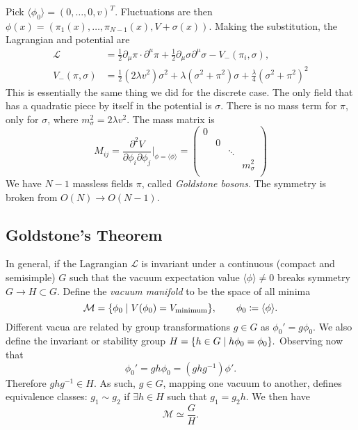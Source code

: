 Pick $\langle \phi_0 \rangle = (0, \dots, 0, v)^T$. Fluctuations are then $\phi(x) = (\pi_1(x), \dots, \pi_{N-1}(x), V + \sigma(x))$.
Making the substitution, the Lagrangian and potential are
\begin{align}
  \mathscr{L} &= \frac{1}{2} \partial_{\mu} \pi \cdot \partial^{\mu} \pi + \frac{1}{2} \partial_{\mu} \sigma \partial^{\mu} \sigma - V_-(\pi_i, \sigma), \\
  V_-(\pi, \sigma) &= \frac{1}{2} (2 \lambda v^2) \sigma^2 + \lambda (\sigma^2 + \pi^2) \sigma + \frac{\lambda}{4} (\sigma^2 + \pi^2)^2
\end{align}
This is essentially the same thing we did for the discrete case.
The only field that has a quadratic piece by itself in the potential is $\sigma$.
There is no mass term for $\pi$, only for $\sigma$, where $m_\sigma^2 = 2 \lambda v^2$.
The mass matrix is
\begin{equation}
  M_{ij} = \frac{\partial^2 V}{\partial \phi_i \partial \phi_j} \rvert_{\phi = \langle \phi \rangle} = 
  \begin{pmatrix}
   0 &  &  &  \\
    & 0 &  &  \\
    &  & \ddots &  \\
    &  &  & m_\sigma^2 \\
  \end{pmatrix}
\end{equation}
We have $N-1$ massless fields $\pi$, called \emph{Goldstone bosons}.
The symmetry is broken from $O(N) \to O(N-1)$.

\subsection{Goldstone's Theorem}%
\label{sub:goldstone_s_theorem}

In general, if the Lagrangian $\mathscr{L}$ is invariant under a continuous (compact and semisimple) $G$ such that the vacuum expectation value $\langle \phi \rangle \neq 0$ breaks symmetry $G \to H \subset G$.
Define the \emph{vacuum manifold} to be the space of all minima
\begin{equation}
  \mathcal{M} = \{\phi_0 \suchthat V(\phi_0) = V_{\text{minimum}}\}, \qquad \phi_0 \coloneqq \langle \phi \rangle.
\end{equation}
Different vacua are related by group transformations $g \in G$ as $\phi_0' = g \phi_0$.
We also define the invariant or stability group $H = \{h \in G \suchthat h \phi_0 = \phi_0\}.$
Observing now that
\begin{equation}
  \phi_0' = g h \phi_0 = (g h g^{-1}) \phi'.
\end{equation}
Therefore $g h g^{-1} \in H$. As such, $g \in G$, mapping one vacuum to another, defines equivalence classes: $g_1 \sim g_2$ if $\exists h \in H$ such that $g_1 = g_2 h$.
We then have
\begin{equation}
  \mathcal{M} \simeq \frac{G}{H}.
\end{equation}

